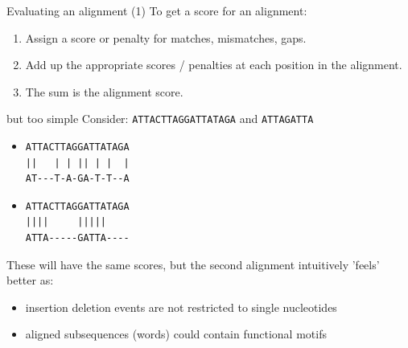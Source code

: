\documentclass[pdf]{beamer}
\newcommand\blfootnote[1]{%
  \begingroup  %
  \renewcommand\thefootnote{}\footnote{#1}%
  \addtocounter{footnote}{-1}  %
  \endgroup
}
\begin{document}
\begin{frame}{Evaluating an alignment (1)}
  To get a score for an alignment:
  \begin{enumerate}
  \item Assign a score or penalty for matches, mismatches, gaps.
  \item Add up the appropriate scores / penalties at each position in the
    alignment.
  \item The sum is the alignment score.
  \end{enumerate}
\end{frame}


\begin{frame}[fragile]{but too simple}
  Consider: \verb|ATTACTTAGGATTATAGA| and \verb|ATTAGATTA|
  \pause
  \begin{itemize}
  \item 
\begin{verbatim}
ATTACTTAGGATTATAGA
||   | | || | |  |
AT---T-A-GA-T-T--A
\end{verbatim} \pause
  \item
\begin{verbatim}
ATTACTTAGGATTATAGA
||||     |||||
ATTA-----GATTA----
\end{verbatim}
\end{itemize}
These will have the same scores, but the second alignment intuitively 'feels' better as:
\begin{itemize}
\item insertion deletion events are not restricted to single nucleotides
\item aligned subsequences (words) could contain functional motifs
\end{itemize}
\end{frame}
\end{document}

